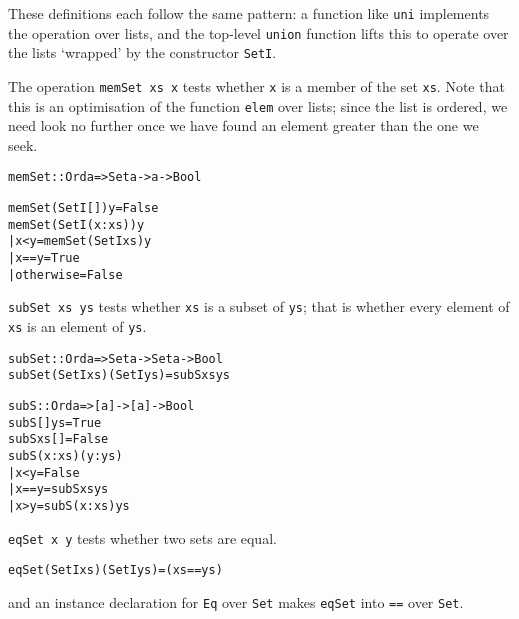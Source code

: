 \documentclass[11pt]{article}
\begin{document}
These definitions 
each follow the same pattern: a function like \texttt{uni} implements
the operation over lists, and the top-level \texttt{union} function
lifts this to operate over the lists `wrapped' by the constructor
\texttt{SetI}.

The operation {\tt memSet xs x} tests whether {\tt x} is a member of the set {\tt xs}.
Note that this is an optimisation of the function {\tt elem} over lists;
since the list is ordered, we need look no further once we have found an
element greater than the one we seek.
\begin{alltt}
memSet :: Ord a => Set a -> a -> Bool

memSet (SetI []) y   = False
memSet (SetI (x:xs)) y 
  | x<y	        = memSet (SetI xs) y
  | x==y        = True
  | otherwise   = False
\end{alltt}
{\tt subSet xs ys} tests whether {\tt xs} is a subset of {\tt ys}; that is whether
every element of {\tt xs} is an element of {\tt ys}.
\begin{alltt}
subSet :: Ord a => Set a -> Set a -> Bool
subSet (SetI xs) (SetI ys) = subS xs ys

subS :: Ord a => [a] -> [a] -> Bool
subS [] ys      = True
subS xs []      = False
subS (x:xs) (y:ys) 
  | x<y         = False
  | x==y        = subS xs ys
  | x>y         = subS (x:xs) ys
\end{alltt}
{\tt eqSet x y} tests whether two sets are equal.
\begin{alltt}
eqSet (SetI xs) (SetI ys) = (xs == ys)
\end{alltt}
and an instance declaration for \texttt{Eq} over \texttt{Set} makes \texttt{eqSet} into
\texttt{==} over \texttt{Set}.
\end{document}
